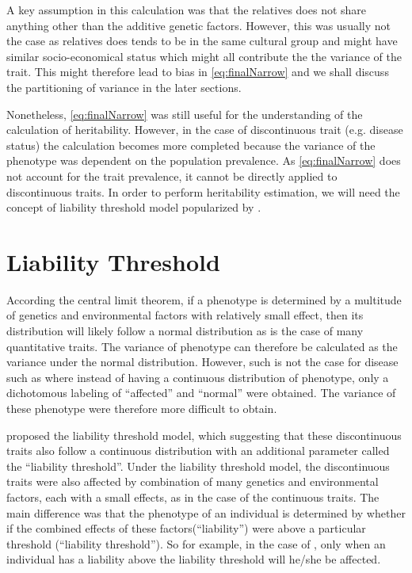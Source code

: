 \documentclass[12pt]{book}
\newcommand*{\glng}{\glsentrylong}
\begin{document}
	A key assumption in this calculation was that the relatives does not share anything other than the additive genetic factors.
	However, this was usually not the case as relatives does tends to be in the same cultural group and might have similar socio-economical status which might all contribute the the variance of the trait.
	This might therefore lead to bias in \cref{eq:finalNarrow} and we shall discuss the partitioning of variance in the later sections.
	
	Nonetheless, \cref{eq:finalNarrow} was still useful for the understanding of the calculation of heritability.
	However, in the case of discontinuous trait (e.g. disease status) the calculation becomes more completed because the variance of the phenotype was dependent on the population prevalence.
	As \cref{eq:finalNarrow} does not account for the trait prevalence, it cannot be directly applied to discontinuous traits.
	In order to perform heritability estimation, we will need the concept of liability threshold model popularized by \cite{Falconer1965}.
	
	\section{Liability Threshold}
	\label{sec:liability}
	According the central limit theorem, if a phenotype is determined by a multitude of genetics and environmental factors with relatively small effect, then its distribution will likely follow a normal distribution as is the case of many quantitative traits\citep{Visscher2008}. %
	The variance of phenotype can therefore be calculated as the variance under the normal distribution.
	However, such is not the case for disease such as \glng{scz} where instead of having a continuous distribution of phenotype, only a dichotomous labeling of ``affected'' and ``normal'' were obtained.
	The variance of these phenotype were therefore more difficult to obtain.
	
	\citet{Falconer1965} proposed the liability threshold model, which suggesting that these discontinuous traits also follow a continuous distribution with an additional parameter called the ``liability threshold''.
	Under the liability threshold model, the discontinuous traits were also affected by combination of many genetics and environmental factors, each with a small effects, as in the case of the continuous traits.
	The main difference was that the phenotype of an individual is determined by whether if the combined effects of these factors(``liability'') were above a particular threshold (``liability threshold'').
	So for example, in the case of \glng{scz}, only when an individual has a liability above the liability threshold will he/she be affected.
	
\end{document}
